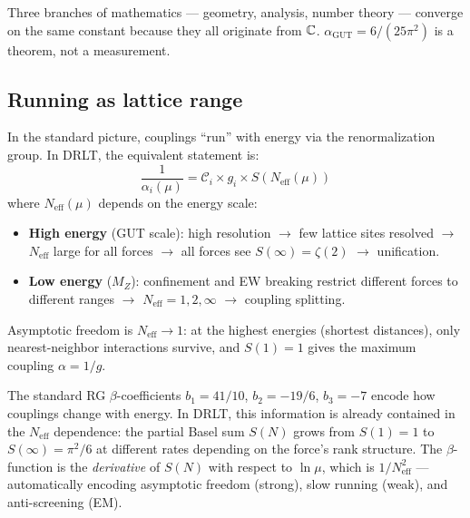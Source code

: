 Three branches of mathematics --- geometry, analysis, number theory --- converge on the same constant because they all originate from $\mathbb{C}$. $\alpha_\text{GUT} = 6/(25\pi^2)$ is a theorem, not a measurement.

\subsection{Running as lattice range}

In the standard picture, couplings ``run'' with energy via the renormalization group. In DRLT, the equivalent statement is:
\begin{equation}
\frac{1}{\alpha_i(\mu)} = \mathcal{C}_i \times g_i \times S\!\left(N_\text{eff}(\mu)\right)
\end{equation}
where $N_\text{eff}(\mu)$ depends on the energy scale:

\begin{itemize}
\item \textbf{High energy} (GUT scale): high resolution $\to$ few lattice sites resolved $\to$ $N_\text{eff}$ large for all forces $\to$ all forces see $S(\infty) = \zeta(2)$ $\to$ unification.
\item \textbf{Low energy} ($M_Z$): confinement and EW breaking restrict different forces to different ranges $\to$ $N_\text{eff} = 1, 2, \infty$ $\to$ coupling splitting.
\end{itemize}

Asymptotic freedom is $N_\text{eff} \to 1$: at the highest energies (shortest distances), only nearest-neighbor interactions survive, and $S(1) = 1$ gives the maximum coupling $\alpha = 1/g$.

\begin{remark}
The standard RG $\beta$-coefficients $b_1 = 41/10$, $b_2 = -19/6$, $b_3 = -7$ encode how couplings change with energy. In DRLT, this information is already contained in the $N_\text{eff}$ dependence: the partial Basel sum $S(N)$ grows from $S(1) = 1$ to $S(\infty) = \pi^2/6$ at different rates depending on the force's rank structure. The $\beta$-function is the \emph{derivative} of $S(N)$ with respect to $\ln\mu$, which is $1/N_\text{eff}^2$ --- automatically encoding asymptotic freedom (strong), slow running (weak), and anti-screening (EM).
\end{remark}

